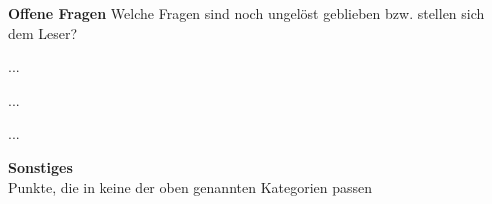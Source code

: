 \textbf{Offene Fragen} 
Welche Fragen sind noch ungelöst geblieben bzw. stellen sich dem Leser?
\begin{description}[leftmargin=!,labelwidth=\widthof{\bfseries [(I1)]}]
	\item [(O1)] {...}
	\item [(O2)] {...}
	\item [(O3)] {...}
\end{description}

\textbf{Sonstiges} \\
Punkte, die in keine der oben genannten Kategorien passen
